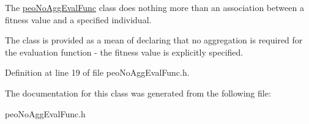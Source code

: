 The \hyperlink{classpeoNoAggEvalFunc}{peo\-No\-Agg\-Eval\-Func} class does nothing more than an association between a fitness value and a specified individual. 

The class is provided as a mean of declaring that no aggregation is required for the evaluation function - the fitness value is explicitly specified. 



Definition at line 19 of file peo\-No\-Agg\-Eval\-Func.h.

The documentation for this class was generated from the following file:\begin{CompactItemize}
\item 
peo\-No\-Agg\-Eval\-Func.h\end{CompactItemize}
